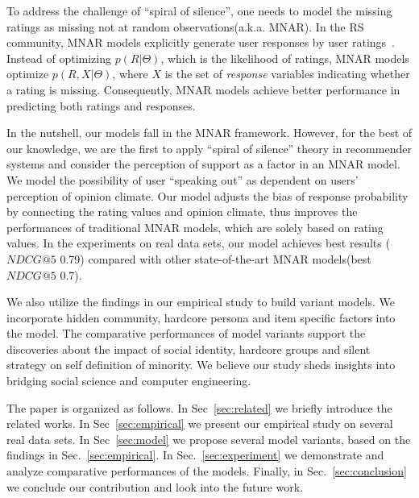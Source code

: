 \documentclass[sigconf]{acmart}
\begin{document}
To address the challenge of ``spiral of silence'', one needs to model the missing ratings as missing not at random observations(a.k.a. MNAR). In the RS community,  MNAR models explicitly generate user responses by user ratings~\cite{Hernandez-Lobato2014Probabilistic,Steck2010Training,Marlin2009Collaborative}. Instead of optimizing $p(R|\Theta)$, which is the likelihood of ratings, MNAR models optimize $p(R,X|\Theta)$, where $X$ is the set of \textit{response} variables indicating whether a rating is missing. Consequently, MNAR models achieve better performance in predicting both ratings and responses.

In the nutshell, our models fall in the MNAR framework. However, for the best of our knowledge, we are the first to apply ``spiral of silence'' theory in recommender systems and consider the perception of support as a factor in an MNAR model. We model the possibility of user ``speaking out'' as dependent on users' perception of opinion climate.  Our model adjusts the bias of response probability by connecting the rating values and opinion climate, thus improves the performances of traditional MNAR models, which are solely based on rating values.  In the experiments on real data sets, our model achieves best results ($NDCG@5$ 0.79) compared with other state-of-the-art MNAR models(best $NDCG@5$ 0.7).

We also utilize the findings in our empirical study to build variant models. We incorporate hidden community, hardcore persona and item specific factors into the model. The comparative performances of model variants support the discoveries about the impact of social identity, hardcore groups and silent strategy on self definition of minority. We believe our study sheds insights into bridging social science and computer engineering.

The paper is organized as follows. In Sec~\ref{sec:related} we briefly introduce the related works. In Sec~\ref{sec:empirical} we present our empirical study on several real data sets. In Sec~\ref{sec:model} we propose several model variants, based on the findings in Sec.~\ref{sec:empirical}. In Sec.~\ref{sec:experiment} we demonstrate and analyze comparative performances of the models. Finally, in Sec.~\ref{sec:conclusion} we conclude our contribution and look into the future work.
\end{document}
